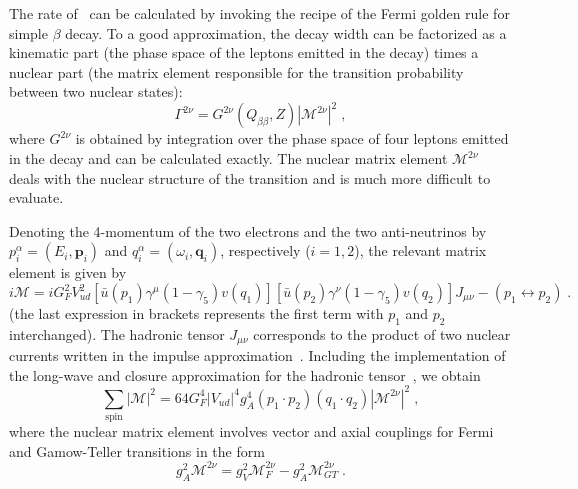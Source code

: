 The rate of \nnbb\ can be calculated by invoking the recipe of the Fermi golden
rule for simple $\beta$ decay. To a good approximation, the decay width can be
factorized as a kinematic part (the phase space of the leptons emitted in the
decay) times a nuclear part (the matrix element responsible for the transition
probability between two nuclear states):
\begin{equation}
  \Gamma^{2\nu} = G^{2\nu}(Q_{\beta\beta},Z) |\mathcal{M}^{2\nu}|^2 \;,
\end{equation}
where $G^{2\nu}$ is obtained by integration over the phase space of four
leptons emitted in the decay and can be calculated exactly. The nuclear matrix
element $\mathcal{M}^{2\nu}$ deals with the nuclear structure of the transition
and is much more difficult to evaluate.

Denoting the 4-momentum of the two electrons and the two anti-neutrinos by
$p^\alpha_i=(E_i,\mathbf{p}_i)$ and $q^\alpha_i=(\omega_i,\mathbf{q}_i)$,
respectively ($i=1,2$), the relevant matrix element is given by
\begin{equation}
  i\mathcal{M} = iG^2_F V^2_{ud} [\bar{u}(p_1) \gamma^\mu (1-\gamma_5) v(q_1)]
                 [\bar{u}(p_2) \gamma^\nu (1-\gamma_5) v(q_2)] J_{\mu\nu} -
                 (p_1\leftrightarrow p_2) \;.
\end{equation}
(the last expression in brackets represents the first term with $p_1$ and $p_2$
interchanged).  The hadronic tensor $J_{\mu\nu}$ corresponds to the product of
two nuclear currents written in the impulse approximation~\cite{Tomoda1991}.
Including the implementation of the long-wave and closure approximation for the
hadronic tensor~\cite{Tomoda1991}, we obtain
\begin{equation}
  \sum_\text{spin} |\mathcal{M}|^2 = 64 G^4_F |V_{ud}|^4 g^4_A (p_1 \cdot p_2)
                                     (q_1 \cdot q_2) |\mathcal{M}^{2\nu}|^2 \;,
\end{equation}
where the nuclear matrix element involves vector and axial couplings for Fermi
and Gamow-Teller transitions in the form
\begin{equation}
  g^2_A\mathcal{M}^{2\nu} = g^2_V \mathcal{M}^{2\nu}_F -
                            g^2_A \mathcal{M}^{2\nu}_{GT} \;.
\end{equation}

